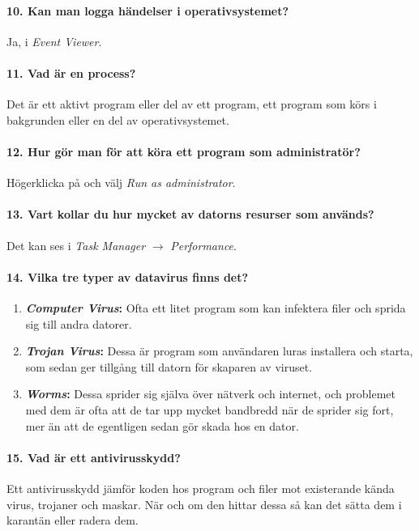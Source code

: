 \paragraph{10. Kan man logga händelser i operativsystemet?}
Ja, i \textit{Event Viewer}.

\paragraph{11. Vad är en process?}
Det är ett aktivt program eller del av ett program, ett program som körs i bakgrunden eller en del av operativsystemet.

\paragraph{12. Hur gör man för att köra ett program som administratör?}
Högerklicka på och välj \textit{Run as administrator}.

\paragraph{13. Vart kollar du hur mycket av datorns resurser som används?}
Det kan ses i \textit{Task Manager} $\rightarrow$ \textit{Performance}.

\paragraph{14. Vilka tre typer av datavirus finns det?}
\begin{enumerate}
	\item \textbf{\textit{Computer Virus}:} Ofta ett litet program som kan infektera filer och sprida sig till andra datorer.
	\item \textbf{\textit{Trojan Virus}:} Dessa är program som användaren luras installera och starta, som sedan ger tillgång till datorn för skaparen av viruset.
	\item \textbf{\textit{Worms}:} Dessa sprider sig själva över nätverk och internet, och problemet med dem är ofta att de tar upp mycket bandbredd när de sprider sig fort, mer än att de egentligen sedan gör skada hos en dator.
\end{enumerate}

\paragraph{15. Vad är ett antivirusskydd?}
Ett antivirusskydd jämför koden hos program och filer mot existerande kända virus, trojaner och maskar. När och om den hittar dessa så kan det sätta dem i karantän eller radera dem.

